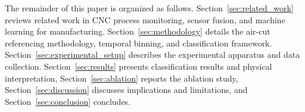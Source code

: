 The remainder of this paper is organized as follows. Section~\ref{sec:related_work} reviews related work in CNC process monitoring, sensor fusion, and machine learning for manufacturing. Section~\ref{sec:methodology} details the air-cut referencing methodology, temporal binning, and classification framework. Section~\ref{sec:experimental_setup} describes the experimental apparatus and data collection. Section~\ref{sec:results} presents classification results and physical interpretation, Section~\ref{sec:ablation} reports the ablation study, Section~\ref{sec:discussion} discusses implications and limitations, and Section~\ref{sec:conclusion} concludes.
